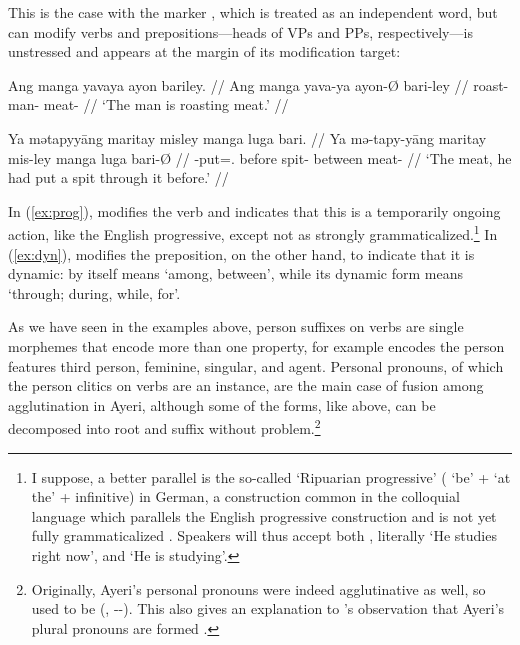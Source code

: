 This is the case with the marker , which is treated as an 
independent word, but can modify verbs and prepositions---heads of VPs and 
PPs, respectively---is unstressed and appears at the margin of its 
modification target:

\pex
\a\label{ex:prog}\begingl
	\gla Ang manga yavaya ayon bariley. //
	\glb Ang manga yava-ya ayon-Ø bari-ley //
	\glc \AgtT{} \Prog{} roast-\TsgM{} man-\Top{} meat-\PargI{} //
	\glft `The man is roasting meat.' //
\endgl

\a\label{ex:dyn}\begingl
	\gla Ya mətapyyāng maritay misley manga luga bari. //
	\glb Ya mə-tapy-yāng maritay mis-ley manga luga bari-Ø //
	\glc \LocT{} \Pst{}-put=\TsgM{}.\Aarg{} before spit-\PargI{} \Dyn{} 
		between meat-\Top{} //
	\glft `The meat, he had put a spit through it before.' //
\endgl

\xe

In (\ref{ex:prog}),  modifies the verb  
and indicates that this is a temporarily ongoing action, like the English 
progressive, except not as strongly grammaticalized.\footnote{I suppose, a 
better parallel is the so-called  `Ripuarian 
progressive' ( `be' +  `at the' + infinitive) in German, a 
construction common in the colloquial language which parallels the English 
progressive construction and is not yet fully grammaticalized 
\citep[435]{dudengram2016}. Speakers will thus accept both , literally `He studies right now', and  `He is 
studying'.
% 
}
%
In (\ref{ex:dyn}),  modifies the preposition, on the other 
hand, to indicate that it is dynamic:  by itself means `among, 
between', while its dynamic form  means `through; 
during, while, for'.

As we have seen in the examples above, person suffixes on verbs are single 
morphemes that encode more than one property, for example  
encodes the person features third person, feminine, singular, and agent. 
Personal pronouns, of which the person clitics on 
verbs are an instance, are the main case of fusion among agglutination in Ayeri, 
although some of the forms, like  above, can be 
decomposed into root and suffix without problem.\footnote{Originally, Ayeri's 
personal pronouns were indeed agglutinative as well, so  
used to be  (, \Tsg{}-\F{}-\Aarg{}). This 
also gives an explanation to \citet{boga2016}'s observation that Ayeri's plural 
pronouns are formed .}

